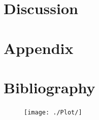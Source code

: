\documentclass{article}
\begin{document}
\section{Discussion}

\section{Appendix}

\section{Bibliography}

\begin{figure}
    \begin{center}
        \texttt{[image: ./Plot/]}
        \caption{}
        \label{}
    \end{center}
\end{figure}
\end{document}
